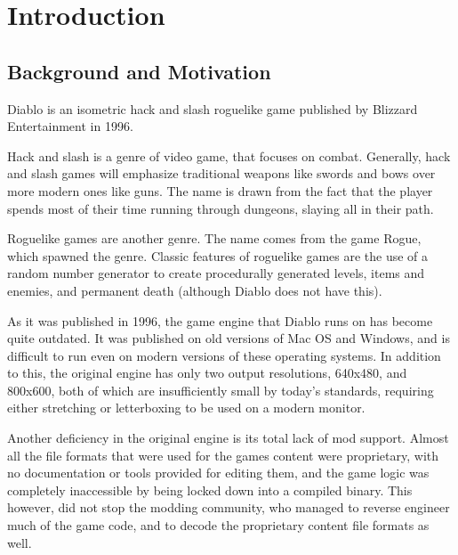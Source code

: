 \chapter{Introduction}
	\section{Background and Motivation}
	Diablo is an isometric hack and slash roguelike game published by Blizzard Entertainment in 1996\cite{diablo}.
	
	Hack and slash is a genre of video game, that focuses on combat. Generally, hack and slash games will emphasize   traditional weapons like swords and bows over more modern ones like guns. The name is drawn from the fact that the player spends most of their time running through dungeons, slaying all in their path.
	
	Roguelike games are another genre. The name comes from the game Rogue\cite{rogue}, which spawned the genre.
	Classic features of roguelike games are the use of a random number generator to create procedurally generated levels, items and enemies, and permanent death (although Diablo does not have this).
	
	As it was published in 1996, the game engine that Diablo runs on has become quite outdated. It was published on old versions of Mac OS and Windows, and is difficult to run even on modern versions of these operating systems.
	In addition to this, the original engine has only two output resolutions, 640x480, and 800x600, both of which are insufficiently small by today's standards, requiring either stretching or letterboxing to be used on a modern monitor.
	
	Another deficiency in the original engine is its total lack of mod support. Almost all the file formats that were used for the games content were proprietary, with no documentation or tools provided for editing them, and the game logic was completely inaccessible by being locked down into a compiled binary. This however, did not stop the modding community, who managed to reverse engineer much of the game code, and to decode the proprietary content file formats as well.

